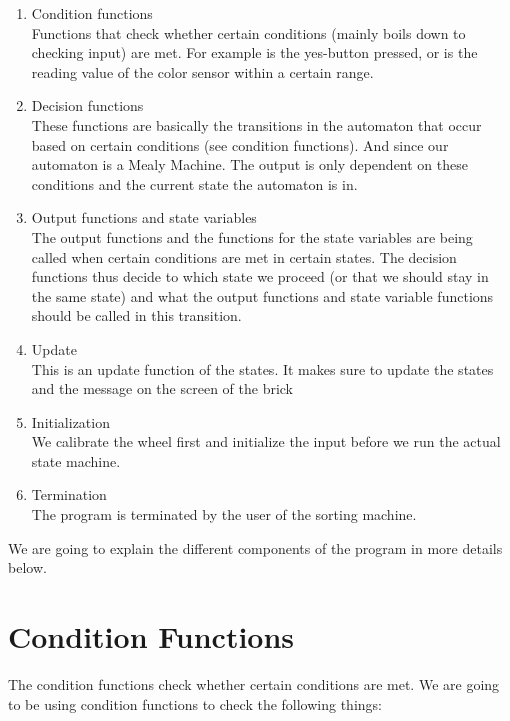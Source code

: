 \begin{enumerate}
	\item Condition functions \label{SD:Condition}\\ 
    Functions that check whether certain conditions (mainly boils down to checking input)  are met. For example is the yes-button pressed, or is the reading value of the color sensor within a certain range. 
    \item Decision functions \label{SD:Decision} \\
    These functions are basically the transitions in the automaton that occur based on certain conditions (see condition functions). And since our automaton is a Mealy Machine. The output is only dependent on these conditions and the current state the automaton is in.
    \item Output functions and state variables \label{SD:Output} \\
    The output functions and the functions for the state variables are being called when certain conditions are met in certain states. The decision functions thus decide to which state we proceed (or that we should stay in the same state) and what the output functions and state variable functions should  be called in this transition.
    \item Update	\label{SD:Update} \\
    This is an update function of the states. It makes sure to update the states and the message on the screen of the brick
    \item Initialization \label{SD:Initialization} \\
    We calibrate the wheel first and initialize the input before we run the actual state machine.
    \item Termination \label{SD:Termination} \\
    The program is terminated by the user of the sorting machine.
\end{enumerate}

We are going to explain the different components of the program in more details below.

\section{Condition Functions}
The condition functions check whether certain conditions are met. We are going to be using condition functions to check the following things:

